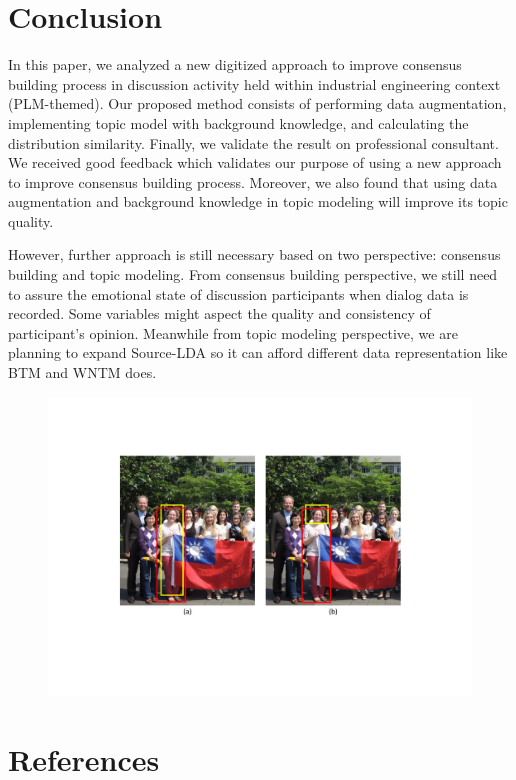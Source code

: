 \documentclass[senior]{IPSstyle}
\begin{document}
\chapter{Conclusion} 

In this paper, we analyzed a new digitized approach to improve consensus building process in discussion activity held within industrial engineering context (PLM-themed). Our proposed method consists of performing data augmentation, implementing topic model with background knowledge, and calculating the distribution similarity. Finally, we validate the result on professional consultant. We received good feedback which validates our purpose of using a new approach to improve consensus building process. Moreover, we also found that using data augmentation and background knowledge in topic modeling will improve its topic quality.

However, further approach is still necessary based on two perspective: consensus building and topic modeling. From consensus building perspective, we still need to assure the emotional state of discussion participants when dialog data is recorded. Some variables might aspect the quality and consistency of participant’s opinion. Meanwhile from topic modeling perspective, we are planning to expand Source-LDA so it can afford different data representation like BTM and WNTM does.

\begin{figure}[t]
    \begin{center}
    \includegraphics[width=0.97\linewidth]{images/start.pdf}
    \end{center}
\vspace{-0.3cm}
    \caption{ }
    \label{fintro}
    \vspace{-0.3cm}
\end{figure} 


\chapter{References}


\end{document}
